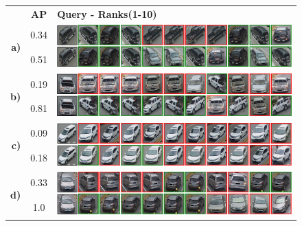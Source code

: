 \documentclass[10pt,twocolumn,letterpaper]{article}
\begin{document}
\begin{figure}[ht]
    \centering
    \renewcommand{\arraystretch}{2.8}
    \begin{tabular}{rcl}
        & \textbf{AP} & \textbf{Query - Ranks(1-10)} \\
    \multirow{2}{*}{\textbf{a)}} & 0.34        &  \multirow{2}{*}{\begin{minipage}{0.7\textwidth} \includegraphics[width=\linewidth]{images/pair_a.png} \end{minipage} }  \\
                                 & 0.51        &                        \\

    \multirow{2}{*}{\textbf{b)}} & 0.19        &  \multirow{2}{*}{\begin{minipage}{0.7\textwidth} \includegraphics[width=\linewidth]{images/pair_b.png} \end{minipage} }  \\
                                 & 0.81        &                        \\

    \multirow{2}{*}{\textbf{c)}} & 0.09        &  \multirow{2}{*}{\begin{minipage}{0.7\textwidth} \includegraphics[width=\linewidth]{images/pair_c.png} \end{minipage} }  \\
                                 & 0.18        &                        \\

    \multirow{2}{*}{\textbf{d)}} & 0.33        &  \multirow{2}{*}{\begin{minipage}{0.7\textwidth} \includegraphics[width=\linewidth]{images/pair_d.png} \end{minipage} }  \\
                                 & 1.0         &
    \end{tabular}
    \renewcommand{\arraystretch}{1}


\end{figure}
\end{document}
